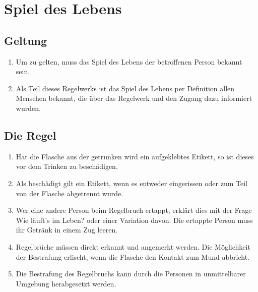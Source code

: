 \chapter{Spiel des Lebens}
\section{Geltung}
\begin{enumerate}[label={(\arabic*)}]
    \item
    Um zu gelten, muss das Spiel des Lebens der betroffenen Person bekannt sein.

    \item
    Als Teil dieses Regelwerks ist das Spiel des Lebens per Definition allen Menschen bekannt, die über das Regelwerk und den Zugang dazu informiert wurden. 
\end{enumerate}

\section{Die Regel}
\begin{enumerate}[label={(\arabic*)}]
    \item
    Hat die Flasche aus der getrunken wird ein aufgeklebtes Etikett, so ist dieses vor dem Trinken zu beschädigen.

    \item
    Als beschädigt gilt ein Etikett, wenn es entweder eingerissen oder zum Teil von der Flasche abgetrennt wurde.

    \item
    Wer eine andere Person beim Regelbruch ertappt, erklärt dies mit der Frage \glqq{}Wie läuft's im Leben?\grqq{} oder einer Variation davon.
    Die ertappte Person muss ihr Getränk in einem Zug leeren.

    \item
    Regelbrüche müssen direkt erkannt und angemerkt werden.
    Die Möglichkeit der Bestrafung erlischt, wenn die Flasche den Kontakt zum Mund abbricht.

    \item
    Die Bestrafung des Regelbruchs kann durch die Personen in unmittelbarer Umgebung herabgesetzt werden.
\end{enumerate}
